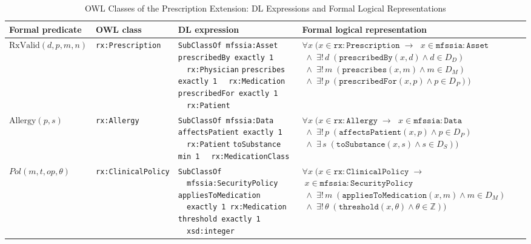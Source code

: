 \documentclass[journal]{IEEEtran}
\begin{document}
\begin{table}[tb]
\centering
\caption{OWL Classes of the Prescription Extension: DL Expressions and Formal Logical Representations}
\label{tab:ontology-classes}
\small
\begin{tabular}{p{2.0cm} p{2.0cm} p{3.6cm} p{5.8cm}}
\toprule
\textbf{Formal predicate} & \textbf{OWL class} & \textbf{DL expression} & \textbf{Formal logical representation} \\
\midrule

$\mathrm{RxValid}(d,p,m,n)$
  & \texttt{rx:Pre\-scrip\-tion}
  & \texttt{SubClassOf mfssia:Asset} \newline
    \texttt{prescribedBy exactly 1} \newline
    \texttt{~~rx:Physician} \newline
    \texttt{prescribes exactly 1} \newline
    \texttt{~~rx:Medication} \newline
    \texttt{prescribedFor exactly 1} \newline
    \texttt{~~rx:Patient}
  & $\forall x\;(x \in \mathtt{rx{:}Prescription} \;\to$
    $\;x \in \mathtt{mfssia{:}Asset}$
    $\;\wedge\; \exists!\,d\;(\mathtt{prescribedBy}(x,d) \wedge d \in D_D)$
    $\;\wedge\; \exists!\,m\;(\mathtt{prescribes}(x,m) \wedge m \in D_M)$
    $\;\wedge\; \exists!\,p\;(\mathtt{prescribedFor}(x,p) \wedge p \in D_P))$ \\[6pt]

$\mathrm{Allergy}(p,s)$
  & \texttt{rx:Allergy}
  & \texttt{SubClassOf mfssia:Data} \newline
    \texttt{affectsPatient exactly 1} \newline
    \texttt{~~rx:Patient} \newline
    \texttt{toSubstance min 1} \newline
    \texttt{~~rx:MedicationClass}
  & $\forall x\;(x \in \mathtt{rx{:}Allergy} \;\to$
    $\;x \in \mathtt{mfssia{:}Data}$
    $\;\wedge\; \exists!\,p\;(\mathtt{affectsPatient}(x,p) \wedge p \in D_P)$
    $\;\wedge\; \exists\,s\;(\mathtt{toSubstance}(x,s) \wedge s \in D_S))$ \\[6pt]

$\mathit{Pol}(m,t,op,\theta)$
  & \texttt{rx:Clini\-cal\-Po\-li\-cy}
  & \texttt{SubClassOf} \newline
    \texttt{~~mfssia:SecurityPolicy} \newline
    \texttt{appliesToMedication} \newline
    \texttt{~~exactly 1 rx:Medication} \newline
    \texttt{threshold exactly 1} \newline
    \texttt{~~xsd:integer}
  & $\forall x\;(x \in \mathtt{rx{:}ClinicalPolicy} \;\to$
    $\;x \in \mathtt{mfssia{:}SecurityPolicy}$
    $\;\wedge\; \exists!\,m\;(\mathtt{appliesToMedication}(x,m) \wedge m \in D_M)$
    $\;\wedge\; \exists!\,\theta\;(\mathtt{threshold}(x,\theta) \wedge \theta \in \mathbb{Z}))$ \\[6pt]


\end{tabular}
\end{table}
\end{document}

